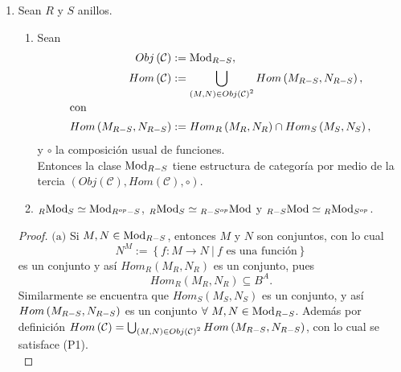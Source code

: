 \documentclass{article}
\newcommand{\lrprth}[1]{
	\left(#1\right)
}
\newcommand{\lrbrack}[1]{
	\left\{#1\right\}
}
\newcommand{\opst}[1]{
	{#1}^{op}
}
\newcommand{\ringmod}[3]{
	\if#3l
	{}_{#1}#2
	\else
	\if#3r
	#2_{#1}
	\fi
	\fi
}
\newcommand{\ringbimod}[4]{
	\if#4l
	{}_{#1-#2}#3
	\else
	\if#4r
	#3_{#1-#2}
	\else 
	\ifstrequal{#4}{lr}{
		{}_{#1}#3_{#2}
	}
	\fi
	\fi
}
\newcommand{\ringmodhom}[3]{
	Hom_{#1}\lrprth{#2,#3}
}
\theoremstyle{definition}
\theoremstyle{plain}
\theoremstyle{plain}
\theoremstyle{definition}
\theoremstyle{definition}
\theoremstyle{definition}
\theoremstyle{definition}
\theoremstyle{definition}
\theoremstyle{definition}
\begin{document}
\begin{enumerate}[label=\textbf{Ej \arabic*.}]
\begin{proof}
	Por el ejercicio 8, se tiene que si $M$ y $N$ son $R$-módulos derechos entonces son $R^{op}$ módulos izquierdos.Asi
	$\cdot$ es  una acción para $Hom_{R^{op}}(M,N)$ y por el ejercicio 8, $\cdot^{op}$ es una acción que vuelve a 
	$Hom_R(M,N)$ un módulo derecho.\\
\end{proof}

\item Sean $R$ y $S$ anillos.
\begin{enumerate}[label=(\alph*)]
	\item Sean 
	\begin{align*}
		Obj\lrprth{\mathcal{C}}&:=\ringbimod{R}{S}{\text{Mod}}{r},\\
		Hom\lrprth{\mathcal{C}}&:=\bigcup_{\lrprth{M,N}\in Obj\lrprth{\mathcal{C}}^2}Hom\lrprth{\ringbimod{R}{S}{M}{r},\ringbimod{R}{S}{N}{r}},\\
		\intertext{con}
		Hom\lrprth{\ringbimod{R}{S}{M}{r},\ringbimod{R}{S}{N}{r}}&:=Hom_R\lrprth{\ringmod{R}{M}{r},\ringmod{R}{N}{r}}\cap Hom_S\lrprth{\ringmod{S}{M}{r},\ringmod{S}{N}{r}},
	\end{align*}
	y $\circ$ la composición usual de funciones.\\ Entonces la clase $\ringbimod{R}{S}{\text{Mod}}{r}$ tiene estructura de categoría por medio de la tercia $\lrprth{Obj\lrprth{\mathcal{C}},Hom\lrprth{\mathcal{C}},\circ}$.
	\item $\ringbimod{R}{S}{\text{Mod}}{lr}\simeq\ringbimod{\opst{R}}{S}{\text{Mod}}{r}$, $\ringbimod{R}{S}{\text{Mod}}{lr}\simeq\ringbimod{R}{\opst{S}}{\text{Mod}}{l}$ y $\ringbimod{R}{S}{\text{Mod}}{l}\simeq\ringbimod{R}{\opst{S}}{\text{Mod}}{lr}$.
\end{enumerate}
\begin{proof}
	$\boxed{\text{(a)}}$ Si $M,N\in\ringbimod{R}{S}{\text{Mod}}{r}$, entonces $M$ y $N$ son conjuntos, con lo cual 
	\begin{equation*}
		N^M:=\lrbrack{f:M\rightarrow N\ |\ f\text{ es una función}}
	\end{equation*} 
    es un conjunto y así $\ringmodhom{R}{M_R}{N_R}$ es un conjunto, pues $$\ringmodhom{R}{M_R}{N_R}\subseteq B^A.$$
     Similarmente se encuentra que $\ringmodhom{S}{M_S}{N_S}$ es un conjunto, y así $Hom\lrprth{\ringbimod{R}{S}{M}{r},\ringbimod{R}{S}{N}{r}}$ es un conjunto $\forall\ M, N\in\ringbimod{R}{S}{\text{Mod}}{r}$. Además por definición $Hom\lrprth{\mathcal{C}}=\bigcup_{\lrprth{M,N}\in Obj\lrprth{\mathcal{C}}^2}Hom\lrprth{\ringbimod{R}{S}{M}{r},\ringbimod{R}{S}{N}{r}}$, con lo cual se satisface (P1).\\

\end{proof}
\end{enumerate}
\end{document}
